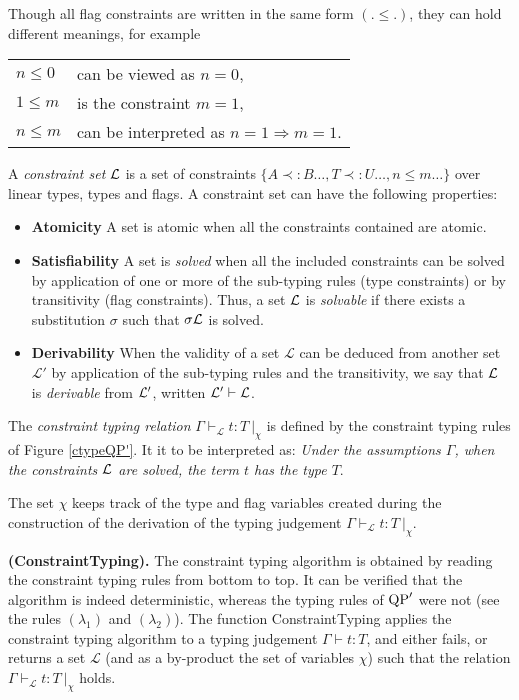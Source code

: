 Though all flag constraints are written in the same form $(. \le .)$, they can hold different meanings, for example
	\begin{center}
	\begin{tabular}{ll}
		$n \le 0$ & can be viewed as $n = 0$, \\
 		$1 \le m$ & is the constraint $m = 1$, \\
 		$n \le m$ & can be interpreted as $n = 1 \Rightarrow m = 1$.
 	\end{tabular}
 	\end{center}

\begin{defn} A {\em constraint set} $\mathcal{L}$ is a set of constraints $\{ A \prec: B \dots, T \prec: U \dots, n \le m \dots\}$
	over linear types, types and flags.
  A constraint set can have the following properties:
  \begin{itemize}
  	\item[]{\bf Atomicity} A set is atomic when all the constraints contained are atomic.
  	\item[]{\bf Satisfiability} A set is \textit{solved} when all the included constraints can be solved by application of one or
  		more of the sub-typing rules (type constraints) or by transitivity (flag constraints).
  		Thus, a set $\mathcal{L}$ is \textit{solvable} if there exists a substitution $\sigma$ such that $\sigma \mathcal{L}$ is solved.
	 	\item[]{\bf Derivability} When the validity of a set $\mathcal{L}$ can be deduced from another set $\mathcal{L'}$ by application of
		  the sub-typing rules and the transitivity, we say that $\mathcal{L}$ is \textit{derivable} from $\mathcal{L}'$,
		  written $\mathcal{L}' \vdash \mathcal{L}$.
  \end{itemize}
\end{defn}

\begin{defn} The \textit{constraint typing relation} $\Gamma \vdash_\mathcal{L} t : T ~|_\chi$ is defined by the constraint typing rules
	of Figure \ref{ctypeQP'}. It it to be interpreted as: \textit{Under the assumptions $\Gamma$, when the constraints $\mathcal{L}$ are solved,
	the term $t$ has the type $T$}. 
\end{defn}

The set $\chi$ keeps track of the type and flag variables created during the construction of the derivation
of the typing judgement $\Gamma \vdash_\mathcal{L} t : T ~|_\chi$. 

\begin{algorithm}{\bf (ConstraintTyping).}
The constraint typing algorithm is obtained by reading the
constraint typing rules from bottom to top. It can be verified that the algorithm is indeed deterministic, whereas the typing
rules of ${\rm QP}'$ were not (see the rules $(\lambda_1)$ and $(\lambda_2)$). 
The function ConstraintTyping applies the constraint
typing algorithm to a typing judgement $\Gamma \vdash t : T$, and either fails, or returns a set $\mathcal{L}$ (and as a by-product the set of
variables $\chi$) such that the relation $\Gamma \vdash_\mathcal{L} t : T ~|_\chi$ holds.
\end{algorithm}	

